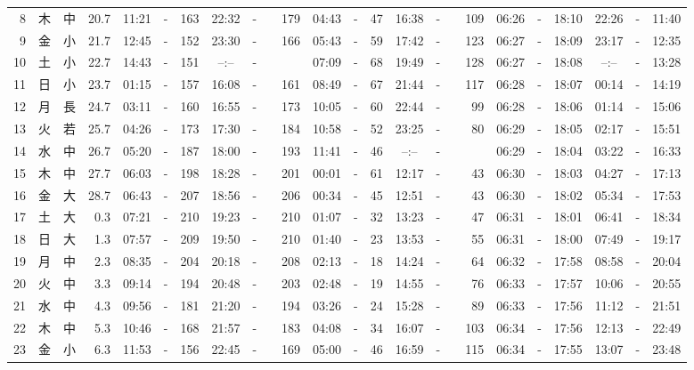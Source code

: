 \documentclass[12pt,a4j]{jsarticle}
\begin{document}
\begin{table}[htbp]
\begin{center}
{\begin{tabular}{|rc|cr|ccrccr|ccrccr|ccc|ccc|}
 8 & 木 & 中 & 20.7 &  11:21 &-& 163 &  22:32 &-& 179 &  04:43 &-&  47 &  16:38 &-& 109 & 06:26 & -& 18:10 & 22:26 & -& 11:40 \\
 9 & 金 & 小 & 21.7 &  12:45 &-& 152 &  23:30 &-& 166 &  05:43 &-&  59 &  17:42 &-& 123 & 06:27 & -& 18:09 & 23:17 & -& 12:35 \\
10 & 土 & 小 & 22.7 &  14:43 &-& 151 &  --:-- &-&~~~~~ &  07:09 &-&  68 &  19:49 &-& 128 & 06:27 & -& 18:08 & --:-- & -& 13:28 \\
11 & 日 & 小 & 23.7 &  01:15 &-& 157 &  16:08 &-& 161 &  08:49 &-&  67 &  21:44 &-& 117 & 06:28 & -& 18:07 & 00:14 & -& 14:19 \\
12 & 月 & 長 & 24.7 &  03:11 &-& 160 &  16:55 &-& 173 &  10:05 &-&  60 &  22:44 &-&  99 & 06:28 & -& 18:06 & 01:14 & -& 15:06 \\
13 & 火 & 若 & 25.7 &  04:26 &-& 173 &  17:30 &-& 184 &  10:58 &-&  52 &  23:25 &-&  80 & 06:29 & -& 18:05 & 02:17 & -& 15:51 \\
14 & 水 & 中 & 26.7 &  05:20 &-& 187 &  18:00 &-& 193 &  11:41 &-&  46 &  --:-- &-&~~~~~ & 06:29 & -& 18:04 & 03:22 & -& 16:33 \\
15 & 木 & 中 & 27.7 &  06:03 &-& 198 &  18:28 &-& 201 &  00:01 &-&  61 &  12:17 &-&  43 & 06:30 & -& 18:03 & 04:27 & -& 17:13 \\
16 & 金 & 大 & 28.7 &  06:43 &-& 207 &  18:56 &-& 206 &  00:34 &-&  45 &  12:51 &-&  43 & 06:30 & -& 18:02 & 05:34 & -& 17:53 \\
17 & 土 & 大 &  0.3 &  07:21 &-& 210 &  19:23 &-& 210 &  01:07 &-&  32 &  13:23 &-&  47 & 06:31 & -& 18:01 & 06:41 & -& 18:34 \\
18 & 日 & 大 &  1.3 &  07:57 &-& 209 &  19:50 &-& 210 &  01:40 &-&  23 &  13:53 &-&  55 & 06:31 & -& 18:00 & 07:49 & -& 19:17 \\
19 & 月 & 中 &  2.3 &  08:35 &-& 204 &  20:18 &-& 208 &  02:13 &-&  18 &  14:24 &-&  64 & 06:32 & -& 17:58 & 08:58 & -& 20:04 \\
20 & 火 & 中 &  3.3 &  09:14 &-& 194 &  20:48 &-& 203 &  02:48 &-&  19 &  14:55 &-&  76 & 06:33 & -& 17:57 & 10:06 & -& 20:55 \\
21 & 水 & 中 &  4.3 &  09:56 &-& 181 &  21:20 &-& 194 &  03:26 &-&  24 &  15:28 &-&  89 & 06:33 & -& 17:56 & 11:12 & -& 21:51 \\
22 & 木 & 中 &  5.3 &  10:46 &-& 168 &  21:57 &-& 183 &  04:08 &-&  34 &  16:07 &-& 103 & 06:34 & -& 17:56 & 12:13 & -& 22:49 \\
23 & 金 & 小 &  6.3 &  11:53 &-& 156 &  22:45 &-& 169 &  05:00 &-&  46 &  16:59 &-& 115 & 06:34 & -& 17:55 & 13:07 & -& 23:48 \\

\end{tabular}}
\end{center}
\end{table}
\end{document}
